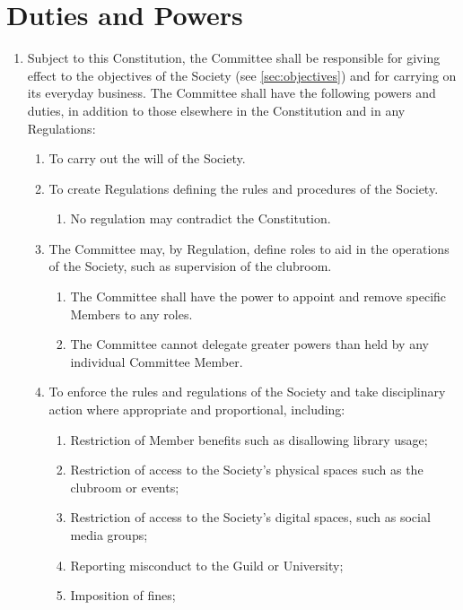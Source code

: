 \documentclass[a4paper]{article}
\begin{document}
\section{Duties and Powers} \label{sec:duties}
\begin{enumerate}
    \item Subject to this Constitution, the Committee shall be responsible for giving effect to the objectives of the Society (see \cref{sec:objectives}) and for carrying on its everyday business. The Committee shall have the following powers and duties, in addition to those elsewhere in the Constitution and in any Regulations:
    \begin{enumerate}
        \item To carry out the will of the Society.
        \item To create Regulations defining the rules and procedures of the Society.
        \begin{enumerate}
            \item No regulation may contradict the Constitution.
        \end{enumerate}
        \item The Committee may, by Regulation, define roles to aid in the operations of the Society, such as supervision of the clubroom.
        \begin{enumerate}
            \item The Committee shall have the power to appoint and remove specific Members to any roles.
            \item The Committee cannot delegate greater powers than held by any individual Committee Member.
        \end{enumerate}
        \item \label{item:enforcing_actions} To enforce the rules and regulations of the Society and take disciplinary action where appropriate and proportional, including:
        \begin{enumerate}
            \item Restriction of Member benefits such as disallowing library usage;
            \item Restriction of access to the Society's physical spaces such as the clubroom or events;
            \item Restriction of access to the Society's digital spaces, such as social media groups;
            \item Reporting misconduct to the Guild or University;
            \item Imposition of fines;

\end{enumerate}
\end{enumerate}
\end{enumerate}
\end{document}
